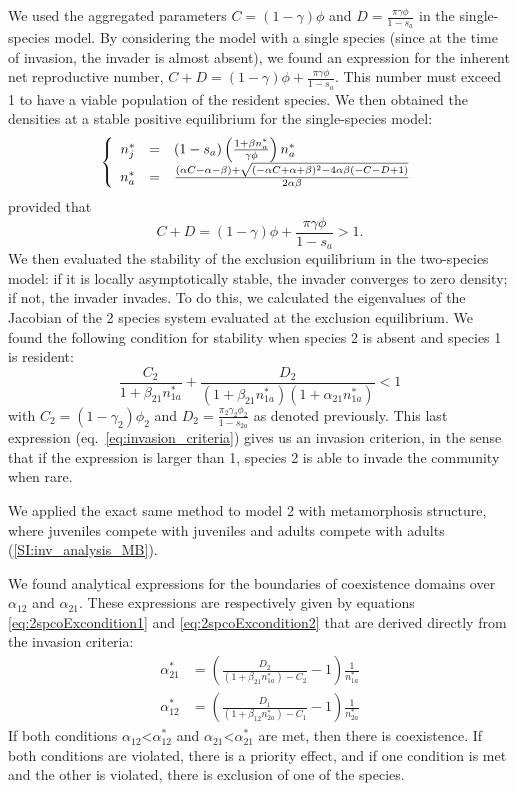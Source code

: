 \documentclass{article}
\begin{document}
We used the aggregated parameters $C= (1-\gamma)\phi$ and $D= \frac{\pi\gamma\phi}{1-s_a}$ in the single-species model. By considering the model with a single species (since at the time of invasion, the invader is almost absent), we found an expression for the inherent net reproductive number, $C+D = (1-\gamma)\phi +\frac{\pi \gamma \phi}{1-s_a}$. This number must exceed 1 to have a viable population of the resident species. We then obtained the densities at a stable positive equilibrium for the single-species model:
\begin{equation}
    \left\{
\begin{array}{r c l}
n_j^* &=&  (1-s_a)\left(\frac{1+\beta n_a^*}{\gamma \phi}\right)n_a^*\\
n_a^* &=& \frac{(\alpha C-\alpha-\beta) + \sqrt{(-\alpha C + \alpha + \beta)^2 - 4\alpha\beta(-C-D+1)}}{2\alpha\beta}
\end{array}
\right.
\end{equation}
provided that
\begin{equation}
   C+D = (1-\gamma)\phi +\frac{\pi \gamma \phi}{1-s_a} > 1. 
\end{equation}
We then evaluated the stability of the exclusion equilibrium in the two-species model: if it is locally asymptotically stable, the invader converges to zero density; if not, the invader invades. To do this, we calculated the eigenvalues of the Jacobian of the 2 species system evaluated at the exclusion equilibrium. We found the following condition for stability when species 2 is absent and species 1 is resident:
\begin{equation}\label{eq:invasion_criteria}
    \frac{C_2}{1+\beta_{21}n_{1a}^*}+\frac{D_2}{(1+\beta_{21}n_{1a}^*)(1+\alpha_{21}n_{1a}^*)} < 1
\end{equation}
with $C_2= (1-\gamma_2)\phi_2$ and $D_2= \frac{\pi_2\gamma_2\phi_2}{1-s_{2a}}$ as denoted previously. This last expression (eq.~\ref{eq:invasion_criteria}) gives us an invasion criterion, in the sense that if the expression is larger than 1, species 2 is able to invade the community when rare. 

We applied the exact same method to model 2 with metamorphosis structure, where juveniles compete with juveniles and adults compete with adults (\ref{SI:inv_analysis_MB}).

We found analytical expressions for the boundaries of coexistence domains over $\alpha_{12}$ and $\alpha_{21}$. These expressions are respectively given by equations \ref{eq:2spcoExcondition1} and \ref{eq:2spcoExcondition2} that are derived directly from the invasion criteria:
\begin{align}
    \alpha_{21}^* &= \left( \frac{D_2}{(1+\beta_{21}n_{1a}^*)-C_2}-1\right)\frac{1}{n_{1a}^*}\label{eq:2spcoExcondition1}\\
    \alpha_{12}^* &= \left( \frac{D_1}{(1+\beta_{12}n_{2a}^*)-C_1}-1\right)\frac{1}{n_{2a}^*}\label{eq:2spcoExcondition2}
\end{align}
If both conditions $\alpha_{12}$<$\alpha_{12}^*$ and $\alpha_{21}$<$\alpha_{21}^*$ are met, then there is coexistence. If both conditions are violated, there is a priority effect, and if one condition is met and the other is violated, there is exclusion of one of the species.
\end{document}

